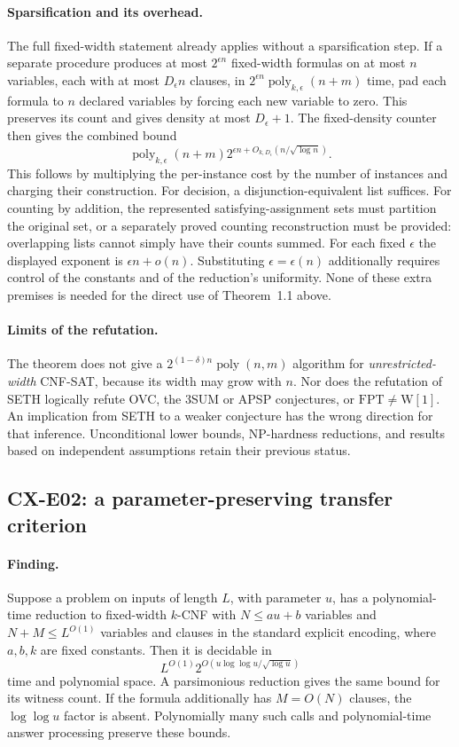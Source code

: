 \paragraph{Sparsification and its overhead.}
The full fixed-width statement already applies without a sparsification
step. If a separate procedure produces at most \(2^{\epsilon n}\)
fixed-width formulas on at most \(n\) variables, each with at most
\(D_\epsilon n\) clauses, in
\(2^{\epsilon n}\operatorname{poly}_{k,\epsilon}(n+m)\) time,
pad each formula to \(n\) declared variables by forcing each new
variable to zero. This preserves its count and gives density at most
\(D_\epsilon+1\).
The fixed-density counter then gives the combined bound
\[
 \operatorname{poly}_{k,\epsilon}(n+m)
 2^{\epsilon n+O_{k,D_\epsilon}(n/\sqrt{\log n})}.
\]
This follows by multiplying the per-instance cost by the number of
instances and charging their construction.
For decision, a disjunction-equivalent list suffices.
For counting by addition, the represented satisfying-assignment sets
must partition the original set, or a separately proved counting
reconstruction must be provided: overlapping lists cannot simply
have their counts summed.
For each fixed \(\epsilon\) the displayed exponent is
\(\epsilon n+o(n)\).
Substituting \(\epsilon=\epsilon(n)\) additionally requires control of
the constants and of the reduction's uniformity.
None of these extra premises is needed for the direct use of
Theorem~1.1 above.

\paragraph{Limits of the refutation.}
The theorem does not give a
\(2^{(1-\delta)n}\operatorname{poly}(n,m)\) algorithm for
\emph{unrestricted-width} CNF-SAT, because its width may grow with \(n\).
Nor does the refutation of SETH logically refute OVC, the 3SUM or APSP
conjectures, or \(\mathrm{FPT}\ne\mathrm{W[1]}\).
An implication from SETH to a weaker conjecture has the wrong direction
for that inference. Unconditional lower bounds, NP-hardness
reductions, and results based on independent assumptions retain their
previous status.

\subsection{CX-E02: a parameter-preserving transfer criterion}
\label{finding:CX-E02}

\paragraph{Finding.}
Suppose a problem on inputs of length \(L\), with parameter \(u\),
has a polynomial-time reduction to fixed-width \(k\)-CNF with
\(N\leq au+b\) variables and \(N+M\leq L^{O(1)}\) variables and clauses
in the standard explicit encoding, where
\(a,b,k\) are fixed constants. Then it is decidable in
\[
 L^{O(1)}
 2^{O(u\log\log u/\sqrt{\log u})}
\]
time and polynomial space.
A parsimonious reduction gives the same bound for its witness count.
If the formula additionally has \(M=O(N)\) clauses, the
\(\log\log u\) factor is absent. Polynomially many such calls and
polynomial-time answer processing preserve these bounds.

